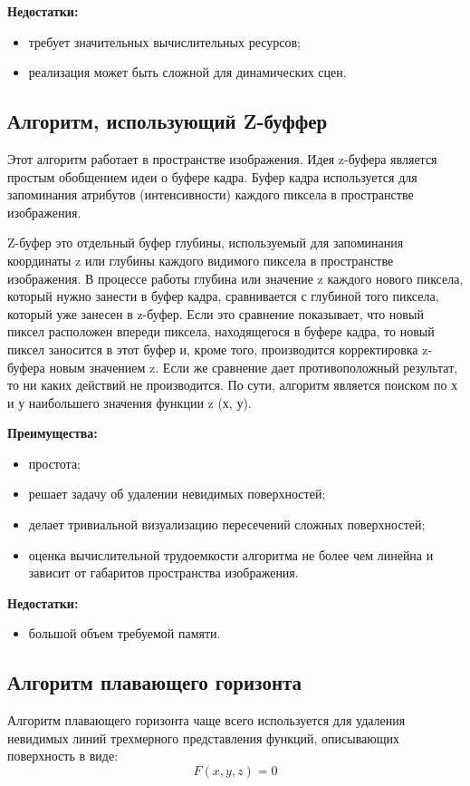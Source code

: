 \textbf{Недостатки:}
\begin{itemize}
	\item требует значительных вычислительных ресурсов;
	\item реализация может быть сложной для динамических сцен.
\end{itemize} 
\subsection{Алгоритм, использующий Z-буффер}
Этот алгоритм работает в пространстве изображения. Идея z-буфера является простым обобщением идеи о буфере кадра. Буфер кадра используется для запоминания атрибутов (интенсивности) каждого пиксела в пространстве изображения. 

Z-буфер это отдельный буфер глубины, используемый для запоминания координаты z или глубины каждого видимого пиксела в пространстве изображения. В процессе работы глубина или значение z каждого нового пиксела, который нужно занести в буфер кадра, сравнивается с глубиной того пиксела, который уже занесен в z-буфер. Если это сравнение показывает, что новый пиксел расположен впереди пиксела, находящегося в буфере кадра, то новый пиксел заносится в этот буфер и, кроме того, производится корректировка z-буфера новым значением z. Если же сравнение дает противоположный результат, то ни каких действий не производится. По сути, алгоритм является поиском по х и у наибольшего значения функции z (х, у).

\textbf{Преимущества:}
\begin{itemize}
	\item простота\cite{rogers};
	\item решает задачу об удалении невидимых поверхностей;
	\item делает тривиальной визуализацию пересечений сложных поверхностей;
	\item оценка вычислительной трудоемкости алгоритма не более чем линейна и зависит от габаритов пространства изображения.
\end{itemize}

\textbf{Недостатки:}
\begin{itemize}
	\item большой объем требуемой памяти.
\end{itemize}
\subsection{Алгоритм плавающего горизонта}
Алгоритм плавающего горизонта чаще всего используется для удаления невидимых линий трехмерного представления функций, описывающих поверхность в виде:
\[
F(x, y, z) = 0
\]

